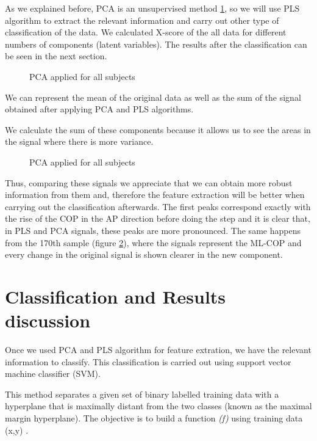 As we explained before, PCA is an unsupervised method \ref{fig:PCA}, so we will use PLS algorithm to extract the relevant information and carry out other type of classification of the data. We calculated X-score of the all data for different numbers of components (latent variables). The results after the classification can be seen in the next section.

\begin{figure}[H]
	\centering
	\caption{PCA applied for all subjects}
	\label{fig:PCA}
\end{figure}

We can represent the mean of the original data as well as the sum of the signal obtained after applying PCA and PLS algorithms.

We calculate the sum of these components because it allows us to see the areas in the signal where there is more variance.
\begin{figure}[H]
	\centering
	\caption{PCA applied for all subjects}
	\label{fig:OrigPCAPLS}
\end{figure}
Thus, comparing these signals we appreciate that we can obtain more robust information from them and, therefore the feature extraction will be better when carrying out the classification afterwards. The first peaks correspond exactly with the rise of the COP in the AP direction before doing the step and it is clear that, in PLS and PCA signals, these peaks are more pronounced. The same happens from the 170th sample (figure \ref{fig:OrigPCAPLS}), where the signals represent the ML-COP and every change in the original signal is shown clearer in the new component.



\section{Classification and Results discussion}

Once we used PCA and PLS algorithm for feature extration, we have the relevant information to classify. This classification is carried out using support vector machine classifier (SVM).

This method separates a given set of binary labelled training data with a hyperplane that is maximally distant from the two classes (known as the maximal margin hyperplane). The objective is to build a function \textit{(f)} using training data (x,y) \cite{Gorriz}.
 
